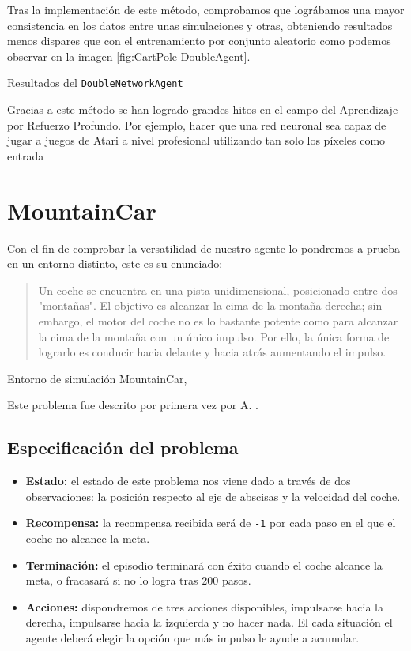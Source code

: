 Tras la implementación de este método, comprobamos que lográbamos una mayor consistencia en los datos entre unas simulaciones y otras, obteniendo resultados menos dispares que con el entrenamiento por conjunto aleatorio como podemos observar en la imagen \ref{fig:CartPole-DoubleAgent}.

%
       {Resultados del \texttt{DoubleNetworkAgent}}

Gracias a este método se han logrado grandes hitos en el campo del Aprendizaje por Refuerzo Profundo. Por ejemplo, hacer que una red neuronal sea capaz de jugar a juegos de Atari a nivel profesional utilizando tan solo los píxeles como entrada \citep{mnih2013playing}


\section{MountainCar}

Con el fin de comprobar la versatilidad de nuestro agente lo pondremos a prueba en un entorno distinto, este es su enunciado:

\begin{quote}
    Un coche se encuentra en una pista unidimensional, posicionado entre dos "montañas". El objetivo es alcanzar la cima de la montaña derecha; sin embargo, el motor del coche no es lo bastante potente como para alcanzar la cima de la montaña con un único impulso. Por ello, la única forma de lograrlo es conducir hacia delante y hacia atrás aumentando el impulso.
\end{quote}

%
       {Entorno de simulación MountainCar, \citet{brockman2016openai}}

Este problema fue descrito por primera vez por A. \citet{Moore90efficientmemory-based}.

\subsection{Especificación del problema}

\begin{itemize}
    \item \textbf{Estado:} el estado de este problema nos viene dado a través de dos observaciones: la posición respecto al eje de abscisas y la velocidad del coche.
    \item \textbf{Recompensa:} la recompensa recibida será de \texttt{-1} por cada paso en el que el coche no alcance la meta.
    \item \textbf{Terminación:} el episodio terminará con éxito cuando el coche alcance la meta, o fracasará si no lo logra tras 200 pasos.
    \item \textbf{Acciones:} dispondremos de tres acciones disponibles, impulsarse hacia la derecha, impulsarse hacia la izquierda y no hacer nada. El cada situación el agente deberá elegir la opción que más impulso le ayude a acumular.
\end{itemize}

